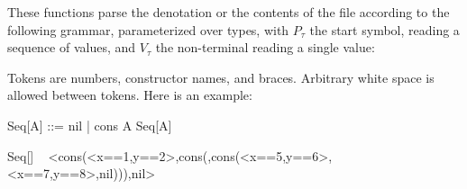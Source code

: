 \documentclass{article}
\begin{document}
These functions parse the denotation or the contents of the file
according to the following grammar, parameterized over types,
with $P_{\tau}$ the start symbol, reading a sequence of values,
and $V_{\tau}$ the non-terminal reading a single value:


Tokens are numbers, constructor names, and braces.  Arbitrary white
space is allowed between tokens. Here is an example:

\begin{zedgroup}
\begin{zdirectives}
\end{zdirectives}
\begin{zed}
  Seq[A] ::= nil | cons \ldata A \cross Seq[A] \rdata 
\end{zed}
\end{zedgroup}

\begin{zexecexpr}
  \typeinfo Seq[] ~ \fromdeno 
\yields
<cons({<x==1,y==2>},cons({},cons({<x==5,y==6>,<x==7,y==8>},nil))),nil>
\end{zexecexpr}


 
\end{document}
